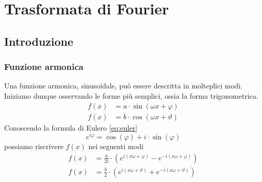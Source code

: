 \chapter{Trasformata di Fourier}

\section{Introduzione}
\subsection{Funzione armonica}
Una funzione armonica, sinusoidale, pu\`o essere descritta in molteplici modi.
Iniziamo dunque osservando le forme pi\`u semplici, ossia la forma
trigonometrica.
\begin{align} \label{eq:harmonics-trig}
    f(x) &= a\cdot\sin (\omega x + \varphi) \\
    f(x) &= b\cdot\cos(\omega x + \vartheta)
\end{align}
Conoscendo la formula di Eulero \eqref{eq:euler}
\begin{equation} \label{eq:euler}
    e^{i\varphi} = \cos(\varphi) + i\cdot\sin(\varphi)
\end{equation}
possiamo riscrivere \(f(x)\) nei seguenti modi
\begin{align} \label{eq:harmonics-complex}
    f(x) &= \frac{a}{2i}\cdot(e^{i(x\omega + \varphi)} - e^{-i(x\omega + \varphi)}) \\
    f(x) &= \frac{b}{2}\cdot(e^{i(x\omega + \vartheta)} + e^{-i(x\omega + \vartheta)})
\end{align}


